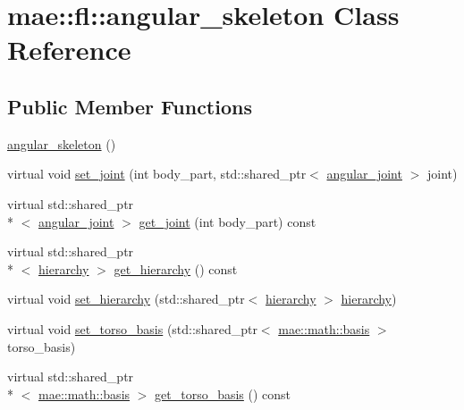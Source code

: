 \hypertarget{classmae_1_1fl_1_1angular__skeleton}{\section{mae\-:\-:fl\-:\-:angular\-\_\-skeleton Class Reference}
\label{classmae_1_1fl_1_1angular__skeleton}
}
\subsection*{Public Member Functions}
\begin{DoxyCompactItemize}
\item 
\hyperlink{classmae_1_1fl_1_1angular__skeleton_a5b9dcc5e7582bdca3d18f14eec629156}{angular\-\_\-skeleton} ()
\item 
virtual void \hyperlink{classmae_1_1fl_1_1angular__skeleton_aa44853baa4576d65a2a1699d2ca10eff}{set\-\_\-joint} (int body\-\_\-part, std\-::shared\-\_\-ptr$<$ \hyperlink{classmae_1_1fl_1_1angular__joint}{angular\-\_\-joint} $>$ joint)
\item 
virtual std\-::shared\-\_\-ptr\\*
$<$ \hyperlink{classmae_1_1fl_1_1angular__joint}{angular\-\_\-joint} $>$ \hyperlink{classmae_1_1fl_1_1angular__skeleton_ad8bd5bc24f4764df37ec334dc236c2a1}{get\-\_\-joint} (int body\-\_\-part) const 
\item 
virtual std\-::shared\-\_\-ptr\\*
$<$ \hyperlink{classmae_1_1hierarchy}{hierarchy} $>$ \hyperlink{classmae_1_1fl_1_1angular__skeleton_a5ce839e030dc0359334e8ba337401417}{get\-\_\-hierarchy} () const 
\item 
virtual void \hyperlink{classmae_1_1fl_1_1angular__skeleton_a4b3d02d386a84c89ba9bb9409a5aa173}{set\-\_\-hierarchy} (std\-::shared\-\_\-ptr$<$ \hyperlink{classmae_1_1hierarchy}{hierarchy} $>$ \hyperlink{classmae_1_1hierarchy}{hierarchy})
\item 
virtual void \hyperlink{classmae_1_1fl_1_1angular__skeleton_a9f1c654e0bf6aab498eeb623656fdf1b}{set\-\_\-torso\-\_\-basis} (std\-::shared\-\_\-ptr$<$ \hyperlink{classmae_1_1math_1_1basis}{mae\-::math\-::basis} $>$ torso\-\_\-basis)
\item 
virtual std\-::shared\-\_\-ptr\\*
$<$ \hyperlink{classmae_1_1math_1_1basis}{mae\-::math\-::basis} $>$ \hyperlink{classmae_1_1fl_1_1angular__skeleton_a752ce57c7aacc53dfdfab0b096fc8e17}{get\-\_\-torso\-\_\-basis} () const 
\item 

\end{DoxyCompactItemize}
